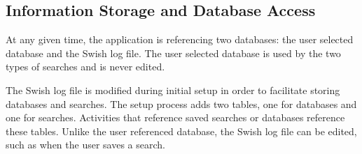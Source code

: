 \documentclass[letterpaper,11pt,twoside,final]{article}
\begin{document}
\subsection*{Information Storage and Database Access}
At any given time, the application is referencing two databases: the
user selected database and the Swish log file. The user selected
database is used by the two types of searches and is never edited.

The Swish log file is modified during initial setup in order to facilitate storing
databases and searches. The setup process adds two tables,
one for databases and one for searches. Activities that reference saved searches or
databases reference these tables. Unlike the user referenced database,
the Swish log file can be edited, such as when the user saves a
search.
\end{document}
